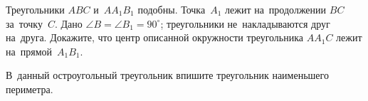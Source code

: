 \begin{problems}
\item
Треугольники $A B C$ и~$A A_1 B_1$ подобны.
Точка~$A_1$ лежит на~продолжении $BC$ за~точку~$C$.
Дано $\angle B = \angle B_1 = 90^{\circ}$;
треугольники не~накладываются друг на~друга.
Докажите, что центр описанной окружности треугольника $A A_1 C$ лежит
на~прямой~$A_1 B_1$.

\item
В~данный остроугольный треугольник впишите треугольник наименьшего периметра.

\end{problems}

